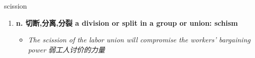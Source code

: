 
\begin{frame}
{\huge scission}
\begin{center}
\begin{enumerate}\Large
  \item \textbf{n. 切断,分离,分裂 a division or split in a group or union: schism}
  \begin{itemize}
    \item \em{\Large{The scission of the labor union will compromise the workers' bargaining power 弱工人讨价的力量}}
  \end{itemize}
\end{enumerate}
\end{center}
\end{frame}
